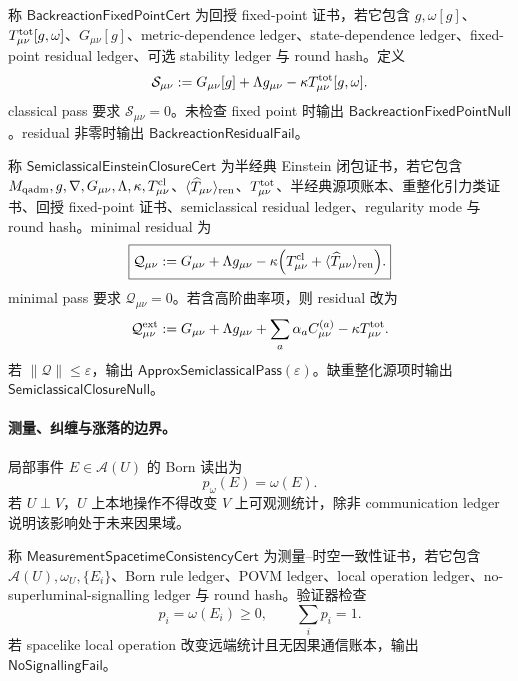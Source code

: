 \begin{definition}\label{def:typed-address-biaxial-completion-backreaction-fixed-point-cert}
称 \(\mathsf{BackreactionFixedPointCert}\) 为回授 fixed-point 证书，若它包含 \(g,\omega[g]\)、\(T^{\rm tot}_{\mu\nu}[g,\omega]\)、\(G_{\mu\nu}[g]\)、metric-dependence ledger、state-dependence ledger、fixed-point residual ledger、可选 stability ledger 与 round hash。定义
\[
\mathcal S_{\mu\nu}
:=
G_{\mu\nu}[g]+\Lambda g_{\mu\nu}
-
\kappa T^{\rm tot}_{\mu\nu}[g,\omega].
\]
classical pass 要求 \(\mathcal S_{\mu\nu}=0\)。未检查 fixed point 时输出 \(\mathsf{BackreactionFixedPointNull}\)。residual 非零时输出 \(\mathsf{BackreactionResidualFail}\)。
\end{definition}

\begin{definition}\label{def:typed-address-biaxial-completion-semiclassical-einstein-closure-cert}
称 \(\mathsf{SemiclassicalEinsteinClosureCert}\) 为半经典 Einstein 闭包证书，若它包含 \(M_{\mathrm{qadm}},g,\nabla,G_{\mu\nu},\Lambda,\kappa,T^{\rm cl}_{\mu\nu}\)、\(\langle\widehat T_{\mu\nu}\rangle_{\rm ren}\)、\(T^{\rm tot}_{\mu\nu}\)、半经典源项账本、重整化引力类证书、回授 fixed-point 证书、semiclassical residual ledger、regularity mode 与 round hash。minimal residual 为
\[
\boxed{
\mathcal Q_{\mu\nu}
:=
G_{\mu\nu}
+
\Lambda g_{\mu\nu}
-
\kappa\Bigl(
T^{\rm cl}_{\mu\nu}
+
\langle\widehat T_{\mu\nu}\rangle_{\rm ren}
\Bigr).
}
\]
minimal pass 要求 \(\mathcal Q_{\mu\nu}=0\)。若含高阶曲率项，则 residual 改为
\[
\mathcal Q^{\rm ext}_{\mu\nu}
:=
G_{\mu\nu}
+
\Lambda g_{\mu\nu}
+
\sum_a\alpha_a C^{(a)}_{\mu\nu}
-
\kappa T^{\rm tot}_{\mu\nu}.
\]
若 \(\|\mathcal Q\|\le\varepsilon\)，输出 \(\mathsf{ApproxSemiclassicalPass}(\varepsilon)\)。缺重整化源项时输出 \(\mathsf{SemiclassicalClosureNull}\)。
\end{definition}

\paragraph{测量、纠缠与涨落的边界。}
局部事件 \(E\in\mathcal A(U)\) 的 Born 读出为
\[
p_\omega(E)=\omega(E).
\]
若 \(U\perp V\)，\(U\) 上本地操作不得改变 \(V\) 上可观测统计，除非 communication ledger 说明该影响处于未来因果域。

\begin{definition}[测量--时空一致性证书]\label{def:typed-address-biaxial-completion-measurement-spacetime-consistency-cert}
称 \(\mathsf{MeasurementSpacetimeConsistencyCert}\) 为测量--时空一致性证书，若它包含 \(\mathcal A(U),\omega_U,\{E_i\}\)、Born rule ledger、POVM ledger、local operation ledger、no-superluminal-signalling ledger 与 round hash。验证器检查
\[
p_i=\omega(E_i)\ge0,
\qquad
\sum_i p_i=1.
\]
若 spacelike local operation 改变远端统计且无因果通信账本，输出 \(\mathsf{NoSignallingFail}\)。
\end{definition}

